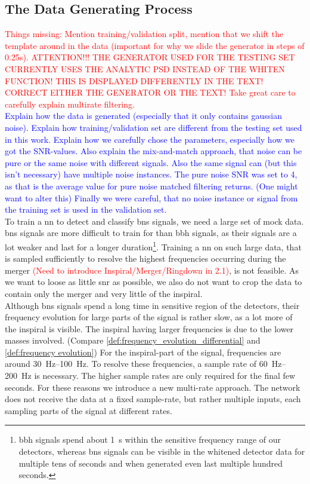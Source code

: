 \subsection{The Data Generating Process}\label{sec:data_generating_process}
\textcolor{red}{Things missing: Mention training/validation split, mention that we shift the template around in the data (important for why we slide the generator in steps of 0.25s). ATTENTION!!! THE GENERATOR USED FOR THE TESTING SET CURRENTLY USES THE ANALYTIC PSD INSTEAD OF THE WHITEN FUNCTION! THIS IS DISPLAYED DIFFERENTLY IN THE TEXT! CORRECT EITHER THE GENERATOR OR THE TEXT! Take great care to carefully explain multirate filtering.}\\
\textcolor{blue}{Explain how the data is generated (especially that it only contains gaussian noise). Explain how training/validation set are different from the testing set used in this work. Explain how we carefully chose the parameters, especially how we got the SNR-values. Also explain the mix-and-match approach, that noise can be pure or the same noise with different signals. Also the same signal can (but this isn't necessary) have multiple noise instances. The pure noise SNR was set to 4, as that is the average value for pure noise matched filtering returns. (One might want to alter this) Finally we were careful, that no noise instance or signal from the training set is used in the validation set.}\\
To train a \gls{nn} to detect and classify \gls{bns} signals, we need a large set of mock data. \gls{bns} signals are more difficult to train for than \gls{bbh} signals, as their signals are a lot weaker and last for a longer duration\footnote{\gls{bbh} signals spend about \SI{1}{\s} within the sensitive frequency range of our detectors, whereas \gls{bns} signals can be visible in the whitened detector data for multiple tens of seconds \cite{gw170817} and when generated even last multiple hundred seconds.}. Training a \gls{nn} on such large data, that is sampled sufficiently to resolve the highest frequencies occurring during the merger \textcolor{red}{(Need to introduce Inspiral/Merger/Ringdown in 2.1)}, is not feasible. As we want to loose as little \gls{snr} as possible, we also do not want to crop the data to contain only the merger and very little of the inspiral.\\
Although \gls{bns} signals spend a long time in sensitive region of the detectors, their frequency evolution for large parts of the signal is rather slow, as a lot more of the inspiral is visible. The inspiral having larger frequencies is due to the lower masses involved. (Compare \eqref{def:frequency_evolution_differential} and \eqref{def:frequency evolution}) For the inspiral-part of the signal, frequencies are around \SIrange{30}{100}{\hertz}. To resolve these frequencies, a sample rate of \SIrange{60}{200}{\hertz} is necessary. The higher sample rates are only required for the final few seconds. For these reasons we introduce a new multi-rate approach. The network does not receive the data at a fixed sample-rate, but rather multiple inputs, each sampling parts of the signal at different rates.\\
